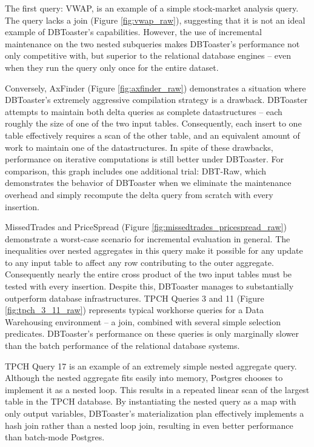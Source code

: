The first query: VWAP, is an example of a simple stock-market analysis query.  The query lacks a join (Figure \ref{fig:vwap_raw}), suggesting that it is not an ideal example of DBToaster's capabilities.  However, the use of incremental maintenance on the two nested subqueries makes DBToaster's performance not only competitive with, but superior to the relational database engines -- even when they run the query only once for the entire dataset.

Conversely, AxFinder (Figure \ref{fig:axfinder_raw}) demonstrates a situation where DBToaster's extremely aggressive compilation strategy is a drawback. DBToaster attempts to maintain both delta queries as complete datastructures -- each roughly the size of one of the two input tables.  Consequently, each insert to one table effectively requires a scan of the other table, and an equivalent amount of work to maintain one of the datastructures.  In spite of these drawbacks, performance on iterative computations is still better under DBToaster.  For comparison, this graph includes one additional trial: DBT-Raw, which demonstrates the behavior of DBToaster when we eliminate the maintenance overhead and simply recompute the delta query from scratch with every insertion.

MissedTrades and PriceSpread (Figure \ref{fig:missedtrades_pricespread_raw}) demonstrate a worst-case scenario for incremental evaluation in general.  The inequalities over nested aggregates in this query make it possible for any update to any input table to affect any row contributing to the outer aggregate.  Consequently nearly the entire cross product of the two input tables must be tested with every insertion.  Despite this, DBToaster manages to substantially outperform  database infrastructures.
TPCH Queries 3 and 11 (Figure \ref{fig:tpch_3_11_raw}) represents typical workhorse queries for a Data Warehousing environment  -- a join, combined with several simple selection predicates.  DBToaster's performance on these queries is only marginally slower than the batch performance of the relational database systems.

TPCH Query 17 is an example of an extremely simple nested aggregate query.  Although the nested aggregate fits easily into memory, Postgres chooses to implement it as a nested loop.  This results in a repeated linear scan of the largest table in the TPCH database.  By instantiating the nested query as a map with only output variables, DBToaster's materialization plan effectively implements a hash join rather than a nested loop join, resulting in even better performance than batch-mode Postgres.

